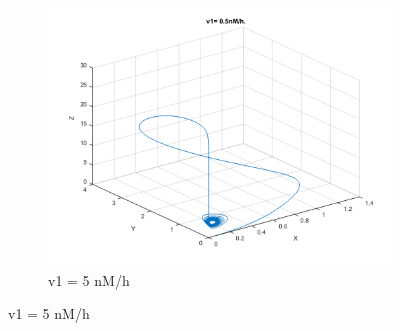 \documentclass[10pt,a4paper,oneside,twocolumn]{article}
\numberwithin{equation}{section} %
\begin{document}
\begin{figure}
\begin{subfigure}[b]{0.3\textwidth}
	    \includegraphics[width=\textwidth]{LotsofthesameA/A-AA5.png}
	    \caption{v1 = 5 nM/h}
	\end{subfigure}
	 

\end{figure}
\end{document}
